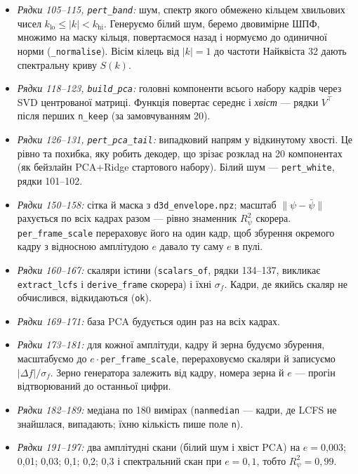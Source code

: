 \begin{itemize}
\item \emph{Рядки 105--115, \texttt{pert\_band}:} шум, спектр якого обмежено кільцем
  хвильових чисел $k_{\mathrm{lo}}\le|k|<k_{\mathrm{hi}}$. Генеруємо білий шум, беремо
  двовимірне ШПФ, множимо на маску кільця, повертаємося назад і нормуємо до одиничної
  норми (\texttt{\_normalise}). Вісім кілець від $|k|=1$ до частоти Найквіста 32 дають
  спектральну криву $S(k)$.
\item \emph{Рядки 118--123, \texttt{build\_pca}:} головні компоненти всього набору кадрів
  через SVD центрованої матриці. Функція повертає середнє і \emph{хвіст} ---
  рядки $V^{\top}$ після перших \texttt{n\_keep} (за замовчуванням 20).
\item \emph{Рядки 126--131, \texttt{pert\_pca\_tail}:} випадковий напрям у відкинутому
  хвості. Це рівно та похибка, яку робить декодер, що зрізає розклад на 20 компонентах
  (як бейзлайн PCA+Ridge стартового набору). Білий шум --- \texttt{pert\_white}, рядки 101--102.
\end{itemize}


\begin{itemize}
\item \emph{Рядки 150--158:} сітка й маска з \texttt{d3d\_envelope.npz}; масштаб
  $\|\psi-\bar\psi\|$ рахується по всіх кадрах разом --- рівно знаменник $R^2_\psi$
  скорера. \texttt{per\_frame\_scale} перераховує його на один кадр, щоб збурення
  окремого кадру з відносною амплітудою $e$ давало ту саму $e$ в пулі.
\item \emph{Рядки 160--167:} скаляри істини (\texttt{scalars\_of}, рядки 134--137, викликає
  \texttt{extract\_lcfs} і \texttt{derive\_frame} скорера) і їхні $\sigma_f$. Кадри, де
  якийсь скаляр не обчислився, відкидаються (\texttt{ok}).
\item \emph{Рядки 169--171:} база PCA будується один раз на всіх кадрах.
\end{itemize}


\begin{itemize}
\item \emph{Рядки 173--181:} для кожної амплітуди, кадру й зерна будуємо збурення,
  масштабуємо до $e\cdot$\texttt{per\_frame\_scale}, перераховуємо скаляри й записуємо
  $|\Delta f|/\sigma_f$. Зерно генератора залежить від кадру, номера зерна й $e$ ---
  прогін відтворюваний до останньої цифри.
\item \emph{Рядки 182--189:} медіана по 180 вимірах (\texttt{nanmedian} --- кадри, де LCFS
  не знайшлася, випадають; їхню кількість пише поле \texttt{n}).
\item \emph{Рядки 191--197:} два амплітудні скани (білий шум і хвіст PCA) на
  $e={}$0,003; 0,01; 0,03; 0,1; 0,2; 0,3 і спектральний скан при
  $e=0{,}1$, тобто $R^2_\psi=0{,}99$.
\end{itemize}

